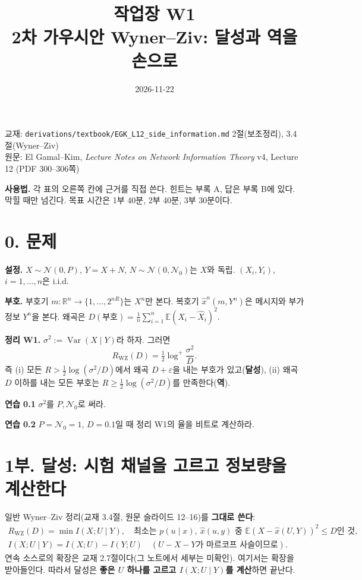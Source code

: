 \documentclass[11pt,a4paper]{article}
\title{\sffamily 작업장 W1\\[2pt]\large 2차 가우시안 Wyner–Ziv: 달성과 역을 손으로}
\author{}
\date{2026-11-22}
\newcommand{\blank}{\rule[-0.3em]{0pt}{1.6em}}
\newcommand{\Var}{\operatorname{Var}}
\newcommand{\E}{\mathbb{E}}
\begin{document}
\maketitle
\vspace{-2.5em}

\begin{center}\small
교재: \texttt{derivations/textbook/EGK\_L12\_side\_information.md} 2절(보조정리), 3.4절(Wyner–Ziv)\\
원문: El Gamal–Kim, \emph{Lecture Notes on Network Information Theory} v4, Lecture 12 (PDF 300–306쪽)
\end{center}

\textbf{사용법.} 각 표의 오른쪽 칸에 근거를 직접 쓴다. 힌트는 부록 A, 답은 부록 B에 있다. 막힐 때만 넘긴다. 목표 시간은 1부 40분, 2부 40분, 3부 30분이다.

\section*{0. 문제}

\textbf{설정.} $X\sim\mathcal N(0,P)$, $Y=X+N$, $N\sim\mathcal N(0,\mathcal N_0)$는 $X$와 독립. $(X_i,Y_i)$, $i=1,\dots,n$은 i.i.d.

\textbf{부호.} 부호기 $m:\mathbb R^n\to\{1,\dots,2^{nR}\}$는 $X^n$만 본다. 복호기 $\hat x^n(m,Y^n)$은 메시지와 부가 정보 $Y^n$을 본다. 왜곡은 $D(\text{부호})=\frac1n\sum_{i=1}^n\E(X_i-\hat X_i)^2$.

\begin{thmbox}
\textbf{정리 W1.} $\sigma^2:=\Var(X\mid Y)$라 하자. 그러면
\[
R_{\mathrm{WZ}}(D)=\tfrac12\log^+\frac{\sigma^2}{D}.
\]
즉 (i) 모든 $R>\frac12\log(\sigma^2/D)$에서 왜곡 $D+\varepsilon$을 내는 부호가 있고(\textbf{달성}), (ii) 왜곡 $D$ 이하를 내는 모든 부호는 $R\ge\frac12\log(\sigma^2/D)$를 만족한다(\textbf{역}).
\end{thmbox}

\textbf{연습 0.1} $\sigma^2$를 $P,\mathcal N_0$로 써라. \hfill\blank

\textbf{연습 0.2} $P=\mathcal N_0=1$, $D=0.1$일 때 정리 W1의 율을 비트로 계산하라. \hfill\blank

\section*{1부. 달성: 시험 채널을 고르고 정보량을 계산한다}

일반 Wyner–Ziv 정리(교재 3.4절, 원문 슬라이드 12–16)를 \textbf{그대로 쓴다}:
\begin{gather*}
R_{\mathrm{WZ}}(D)=\min I(X;U\mid Y),\quad\text{최소는 } p(u\mid x),\ \hat x(u,y)\text{ 중 } \E(X-\hat x(U,Y))^2\le D\text{인 것},\\
I(X;U\mid Y)=I(X;U)-I(Y;U)\quad(U-X-Y\text{가 마르코프 사슬이므로}).
\end{gather*}
연속 소스로의 확장은 교재 2.7절이다(그 노트에서 세부는 미확인). 여기서는 확장을 받아들인다. 따라서 달성은 \textbf{좋은 $U$ 하나를 고르고 $I(X;U\mid Y)$를 계산}하면 끝난다.
\end{document}

